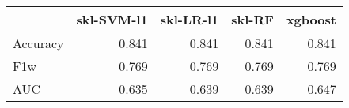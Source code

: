 \begin{tabular}{lrrrr}
\toprule
{} &  skl-SVM-l1 &  skl-LR-l1 &  skl-RF &  xgboost \\
\midrule
Accuracy &       0.841 &      0.841 &   0.841 &    0.841 \\
F1w      &       0.769 &      0.769 &   0.769 &    0.769 \\
AUC      &       0.635 &      0.639 &   0.639 &    0.647 \\
\bottomrule
\end{tabular}
